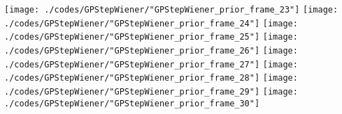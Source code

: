 \begin{frame}{\insertsection}
\begin{center}
{\begin{animateinline}{15}
				 \texttt{[image: ./codes/GPStepWiener/"GPStepWiener\_prior\_frame\_23"]}\newframe
				 \texttt{[image: ./codes/GPStepWiener/"GPStepWiener\_prior\_frame\_24"]}\newframe
				 \texttt{[image: ./codes/GPStepWiener/"GPStepWiener\_prior\_frame\_25"]}\newframe
				 \texttt{[image: ./codes/GPStepWiener/"GPStepWiener\_prior\_frame\_26"]}\newframe
				 \texttt{[image: ./codes/GPStepWiener/"GPStepWiener\_prior\_frame\_27"]}\newframe
				 \texttt{[image: ./codes/GPStepWiener/"GPStepWiener\_prior\_frame\_28"]}\newframe
				 \texttt{[image: ./codes/GPStepWiener/"GPStepWiener\_prior\_frame\_29"]}\newframe
				 \texttt{[image: ./codes/GPStepWiener/"GPStepWiener\_prior\_frame\_30"]}
			 \end{animateinline}
			}
	\end{center}
    
\end{frame}

